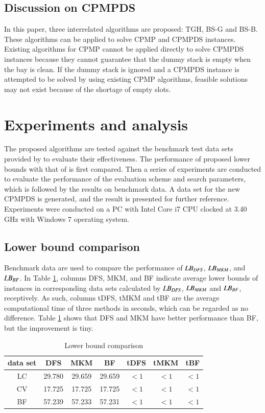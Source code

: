 \documentclass[review,3p,times,authoryear,12pt]{elsarticle}
\begin{document}
\subsection{Discussion on CPMPDS}
In this paper, three interrelated algorithms are proposed: TGH, BS-G and BS-B. These algorithms can be applied to solve CPMP and CPMPDS instances. Existing algorithms for CPMP cannot be applied directly to solve CPMPDS instances because they cannot guarantee that the dummy stack is empty when the bay is clean. If the dummy stack is ignored and a CPMPDS instance is attempted to be solved by using existing CPMP algorithms, feasible solutions may not exist because of the shortage of empty slots.
\section{Experiments and analysis}
\label{sec:ce}
The proposed algorithms are tested against the benchmark test data sets provided by \cite{BF2012} to evaluate their effectiveness.
The performance of proposed lower bounds with that of \cite{BF2012} is first compared. Then a series of experiments are conducted to evaluate the performance of the evaluation scheme and search parameters,
which is followed by the results on benchmark data.
A data set for the new CPMPDS is generated, and the result is presented for further reference. Experiments were conducted on a PC with Intel Core i7 CPU clocked at 3.40 GHz with Windows 7 operating system.

\subsection {Lower bound comparison}
Benchmark data are used to compare the performance of $\id{LB}_\id{DFS}$, $\id{LB}_\id{MKM}$, and $\id{LB}_\id{BF}$. In Table \ref{tab:lowerbound}, columns DFS, MKM, and BF indicate average lower bounds of instances in corresponding data sets calculated by $\id{LB}_\id{DFS}$, $\id{LB}_\id{MKM}$ and $\id{LB}_\id{BF}$, receptively. As such, columns tDFS, tMKM and tBF are the average computational time of three methods in seconds, which can be regarded as no difference. Table \ref{tab:lowerbound} shows that DFS and MKM have better performance than BF, but the improvement is tiny.
\begin{table}[htbp]
\centering
\caption{\label{tab:lowerbound} Lower bound comparison}
\begin{tabular}{c|c|c|c|c|c|c}
    \hline
    data set &    DFS     &     MKM   &   BF     & tDFS    & tMKM   & tBF \\
    \hline
    LC       &   29.780   &   29.659  &  29.659  & $<1$    & $<1$   & $<1$ \\
    CV       &   17.725   &   17.725  &  17.725  & $<1$    & $<1$   & $<1$ \\
    BF       &   57.239   &   57.233  &  57.231  & $<1$    & $<1$   & $<1$ \\
    \hline
    \end{tabular}%

\end{table}
\end{document}
